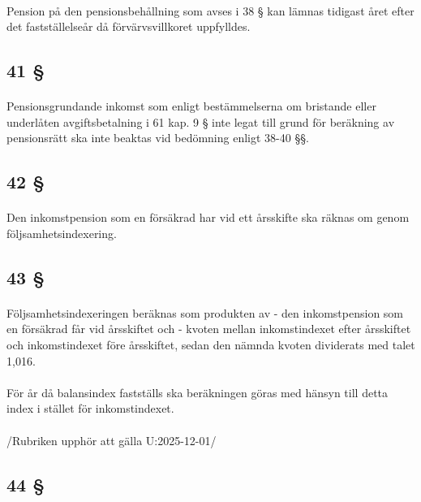 \documentclass[a4paper,notitlepage,openany,10pt]{book}
\begin{document}
\paragraph*{}
Pension på den pensionsbehållning som avses i 38 § kan lämnas tidigast året efter det fastställelseår då förvärvsvillkoret uppfylldes.
\subsection*{41 §}
\paragraph*{}
Pensionsgrundande inkomst som enligt bestämmelserna om bristande eller underlåten avgiftsbetalning i 61 kap. 9 § inte legat till grund för beräkning av pensionsrätt ska inte beaktas vid bedömning enligt 38-40 §§.
\subsection*{42 §}
\paragraph*{}
Den inkomstpension som en försäkrad har vid ett årsskifte ska räknas om genom följsamhetsindexering.
\subsection*{43 §}
\paragraph*{}
Följsamhetsindexeringen beräknas som produkten av
\newline - den inkomstpension som en försäkrad får vid årsskiftet och
\newline - kvoten mellan inkomstindexet efter årsskiftet och inkomstindexet före årsskiftet, sedan den nämnda kvoten dividerats med talet 1,016.
\paragraph*{}
För år då balansindex fastställs ska beräkningen göras med hänsyn till detta index i stället för inkomstindexet.
\paragraph*{}
/Rubriken upphör att gälla U:2025-12-01/
\subsection*{44 §}
\end{document}
